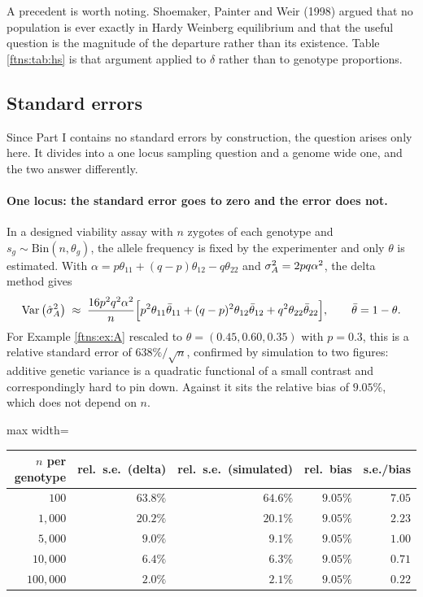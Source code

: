 A precedent is worth noting. Shoemaker, Painter and Weir (1998) argued that no population is ever
exactly in Hardy Weinberg equilibrium and that the useful question is the magnitude of the
departure rather than its existence. Table \ref{ftns:tab:hs} is that argument applied to $\delta$ rather
than to genotype proportions.

\subsection{Standard errors}
\label{ftns:sec:se}

Since Part I contains no standard errors by construction, the question arises only here. It divides
into a one locus sampling question and a genome wide one, and the two answer differently.

\paragraph{One locus: the standard error goes to zero and the error does not.} In a designed
viability assay with $n$ zygotes of each genotype and $s_g\sim\text{Bin}(n,\theta_g)$, the allele
frequency is fixed by the experimenter and only $\theta$ is estimated. With
$\alpha=p\theta_{11}+(q-p)\theta_{12}-q\theta_{22}$ and $\sigma^{2}_{A}=2pq\alpha^2$, the delta method gives
\begin{equation}
\operatorname{Var}\big(\hat\sigma^2_A\big)
\;\approx\;
\frac{16p^2q^2\alpha^2}{n}\Big[p^2\theta_{11}\bar\theta_{11}+(q-p)^2\theta_{12}\bar\theta_{12}
+q^2\theta_{22}\bar\theta_{22}\Big],
\qquad \bar\theta=1-\theta .
\label{ftns:eq:delta}
\end{equation}
For Example \ref{ftns:ex:A} rescaled to $\theta=(0.45,0.60,0.35)$ with $p=0.3$, this is a relative
standard error of $638\%/\sqrt n$, confirmed by simulation to two figures: additive genetic
variance is a quadratic functional of a small contrast and correspondingly hard to pin down.
Against it sits the relative bias of $9.05\%$, which does not depend on $n$.

\begin{center}
\begin{adjustbox}{max width=\textwidth}
\begin{tabular}{rrrrr}
\toprule
$n$ per genotype & rel.\ s.e.\ (delta) & rel.\ s.e.\ (simulated) & rel.\ bias & s.e./bias \\
\midrule
$100$      & $63.8\%$ & $64.6\%$ & $9.05\%$ & $7.05$ \\
$1{,}000$  & $20.2\%$ & $20.1\%$ & $9.05\%$ & $2.23$ \\
$5{,}000$  & $9.0\%$  & $9.1\%$  & $9.05\%$ & $1.00$ \\
$10{,}000$ & $6.4\%$  & $6.3\%$  & $9.05\%$ & $0.71$ \\
$100{,}000$& $2.0\%$  & $2.1\%$  & $9.05\%$ & $0.22$ \\
\bottomrule
\end{tabular}
\end{adjustbox}
\end{center}

